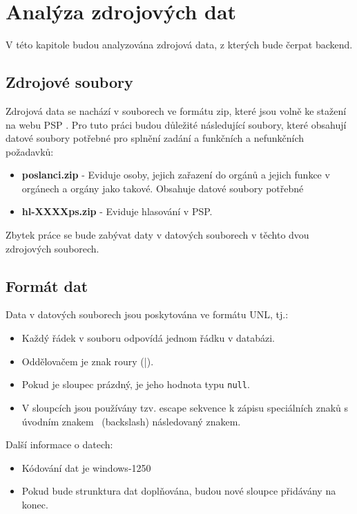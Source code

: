 \chapter{Analýza zdrojových dat}
\label{ch:analysis_data}

\begin{chapterabstract}
	V této kapitole budou analyzována zdrojová data, z kterých bude čerpat backend.
\end{chapterabstract}

\section{Zdrojové soubory}

Zdrojová data se nachází v souborech ve formátu zip, které jsou volně ke stažení na webu PSP \cite{psp-data}. Pro tuto práci budou důležité následující soubory, které obsahují datové soubory potřebné pro splnění zadání a funkčních a nefunkčních požadavků:

\begin{itemize}
	\item \textbf{poslanci.zip} - Eviduje osoby, jejich zařazení do orgánů a jejich funkce v orgánech a orgány jako takové. Obsahuje datové soubory potřebné 
	\item \textbf{hl-XXXXps.zip} - Eviduje hlasování v PSP.
\end{itemize}

\noindent Zbytek práce se bude zabývat daty v datových souborech v těchto dvou zdrojových souborech.

\section{Formát dat}
Data v datových souborech jsou poskytována ve formátu UNL, tj.:

\begin{itemize}
	\item Každý řádek v souboru odpovídá jednom řádku v databázi.
	\item Oddělovačem je znak roury (|).
	\item Pokud je sloupec prázdný, je jeho hodnota typu \texttt{null}.
	\item V sloupcích jsou používány tzv. escape sekvence k zápisu speciálních znaků s úvodním znakem \ (backslash) následovaný znakem.
\end{itemize}

\noindent Další informace o datech:

\begin{itemize}
	\item Kódování dat je windows-1250
	\item Pokud bude strunktura dat doplňována, budou nové sloupce přidávány na konec.
\end{itemize}

